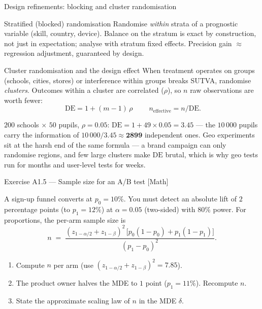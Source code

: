 \documentclass[aspectratio=169,11pt]{beamer}
\begin{document}
\begin{frame}{Design refinements: blocking and cluster randomisation}
  \fontsize{7}{8.4}\selectfont
  \begin{block}{Stratified (blocked) randomisation}
    Randomise \emph{within} strata of a prognostic variable (skill, country, device).
    Balance on the stratum is exact by construction, not just in expectation; analyse
    with stratum fixed effects. Precision gain $\approx$ regression adjustment,
    guaranteed by design.
  \end{block}
  \begin{block}{Cluster randomisation and the design effect}
    When treatment operates on groups (schools, cities, stores) or interference within
    groups breaks SUTVA, randomise \emph{clusters}. Outcomes within a cluster are
    correlated ($\rho$), so $n$ raw observations are worth fewer:
    \[
      \boxed{\;\mathrm{DE} = 1 + (m-1)\,\rho\;}
      \qquad n_{\text{effective}} = n / \mathrm{DE}.
    \]
  \end{block}
  \begin{numexample}
    $200$ schools $\times$ $50$ pupils, $\rho = 0.05$:
    $\mathrm{DE} = 1 + 49 \times 0.05 = \mathbf{3.45}$ --- the $10\,000$ pupils carry the
    information of $10\,000/3.45 \approx \mathbf{2899}$ independent ones.
    Geo experiments sit at the harsh end of the same formula --- a brand campaign can only
    randomise regions, and few large clusters make $\mathrm{DE}$ brutal, which is why geo
    tests run for months and user-level tests for weeks.
  \end{numexample}
\end{frame}

\begin{frame}{Exercise A1.5 --- Sample size for an A/B test [Math]}
\begin{exercise}
  A sign-up funnel converts at $p_0 = 10\%$. You must detect an absolute lift of
  $2$ percentage points (to $p_1 = 12\%$) at $\alpha = 0.05$ (two-sided) with $80\%$
  power. For proportions, the per-arm sample size is
  \[
    n \;=\; \frac{(z_{1-\alpha/2}+z_{1-\beta})^2\,\big[p_0(1-p_0) + p_1(1-p_1)\big]}{(p_1-p_0)^2}.
  \]
  \begin{enumerate}
    \item Compute $n$ per arm (use $(z_{1-\alpha/2}+z_{1-\beta})^2 = 7.85$).
    \item The product owner halves the MDE to $1$ point ($p_1 = 11\%$). Recompute $n$.
    \item State the approximate scaling law of $n$ in the MDE $\delta$.
  \end{enumerate}
\end{exercise}
\end{frame}
\end{document}
